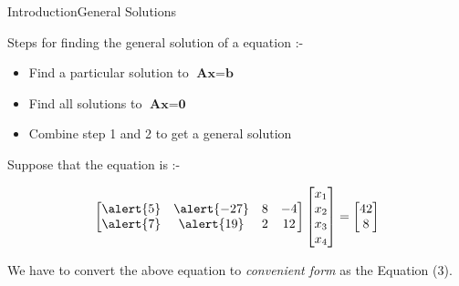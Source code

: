 \documentclass[10pt]{beamer}
\begin{document}
\begin{frame}{Introduction}{General Solutions}

Steps for finding the general solution of a equation :-

\begin{itemize}
\item  Find a particular solution to $\textbf{A}\textbf{x}=\textbf{b}$
\item Find all solutions to $\textbf{A}\textbf{x}=\textbf{0}$
\item Combine step 1 and 2 to get a general solution
\end{itemize}

\pause 

Suppose that the equation is :-

\begin{align}
\begin{bmatrix} \alert{5} & \alert{-27} & 8 & -4 \\ \alert{7} & \alert{19} & 2 & 12 \end{bmatrix}\begin{bmatrix}x_{1}\\x_{2}\\x_{3}\\x_{4}\end{bmatrix} = \begin{bmatrix}42\\8\end{bmatrix}
\end{align}

\pause 

We have to convert the above equation to \textit{convenient form} as the Equation (3).
\end{frame}
\end{document}
